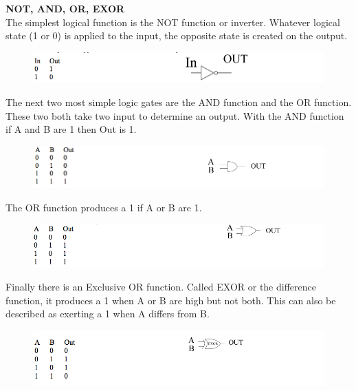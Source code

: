 \documentclass[12pt]{article}
\begin{document}
\begin{enumerate}[1.]
{\bf NOT, AND, OR, EXOR}\\
The simplest logical function is the NOT function or inverter. 
Whatever logical state (1 or 0) is applied to the input, the opposite state is created on the output.
\begin{figure}[!ht]
\begin{center}
\includegraphics[width=\textwidth,trim=0 0 0 0,clip=false]{not.png}
\end{center}
\end{figure}
\par The next two most simple logic gates are the AND function and the OR function. 
These two both take two input to determine an output. 
With the AND function if A and B are 1 then Out is 1.
\begin{figure}[!ht]
\begin{center}
\includegraphics[width=\textwidth,trim=0 0 0 0,clip=false]{and.png}
\end{center}
\end{figure}
\par The OR function produces a 1 if A or B are 1.
\begin{figure}[!ht]
\begin{center}
\includegraphics[width=\textwidth,trim=0 0 0 0,clip=false]{or.png}
\end{center}
\end{figure}
\par Finally there is an Exclusive OR function. Called EXOR or the difference function, it produces a 1 when A or B are high but not both. This can also be described as exerting a 1 when A differs from B.
\begin{figure}[!ht]
\begin{center}
\includegraphics[width=\textwidth,trim=0 0 0 0,clip=false]{exor.png}

\end{center}
\end{figure}
\end{enumerate}
\end{document}
